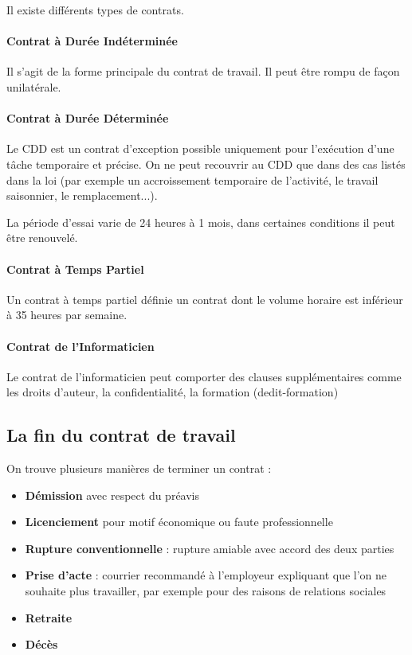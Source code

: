 \documentclass[10pt,a4paper]{article}
\begin{document}
Il existe différents types de contrats.

\paragraph{Contrat à Durée Indéterminée}

Il s'agit de la forme principale du contrat de travail. Il peut être rompu de façon unilatérale.

\paragraph{Contrat à Durée Déterminée}

Le CDD est un contrat d'exception possible uniquement pour l'exécution d'une tâche temporaire et précise. On ne peut recouvrir au CDD que dans des cas listés dans la loi (par exemple un accroissement temporaire de l'activité, le travail saisonnier, le remplacement...).

La période d'essai varie de 24 heures à 1 mois, dans certaines conditions il peut être renouvelé.

\paragraph{Contrat à Temps Partiel}

Un contrat à temps partiel définie un contrat dont le volume horaire est inférieur à 35 heures par semaine.

\paragraph{Contrat de l'Informaticien}

Le contrat de l'informaticien peut comporter des clauses supplémentaires comme les droits d'auteur, la confidentialité, la formation (dedit-formation)

\subsection{La fin du contrat de travail}

On trouve plusieurs manières de terminer un contrat :

\begin{itemize}
\item \textbf{Démission} avec respect du préavis
\item \textbf{Licenciement} pour motif économique ou faute professionnelle
\item \textbf{Rupture conventionnelle} : rupture amiable avec accord des deux parties
\item \textbf{Prise d'acte} : courrier recommandé à l'employeur expliquant que l'on ne souhaite plus travailler, par exemple pour des raisons de relations sociales
\item \textbf{Retraite}
\item \textbf{Décès}
\end{itemize}
\end{document}
